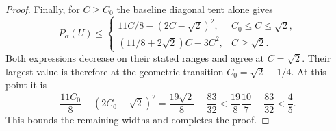 \begin{proof}
Finally, for $C\ge C_0$ the baseline diagonal tent alone gives
\[
 P_\alpha(U)\le
 \begin{cases}
  11C/8-(2C-\sqrt2)^2,&C_0\le C\le\sqrt2,\\
  (11/8+2\sqrt2)C-3C^2,&C\ge\sqrt2.
 \end{cases}
\]
Both expressions decrease on their stated ranges and agree at
$C=\sqrt2$. Their largest value is therefore at the geometric
transition $C_0=\sqrt2-1/4$. At this point it is
\[
 \frac{11C_0}{8}-(2C_0-\sqrt2)^2
 =\frac{19\sqrt2}{8}-\frac{83}{32}
 <\frac{19}{8}\frac{10}{7}-\frac{83}{32}<\frac45.
\]
This bounds the remaining widths and completes the proof.
\end{proof}
